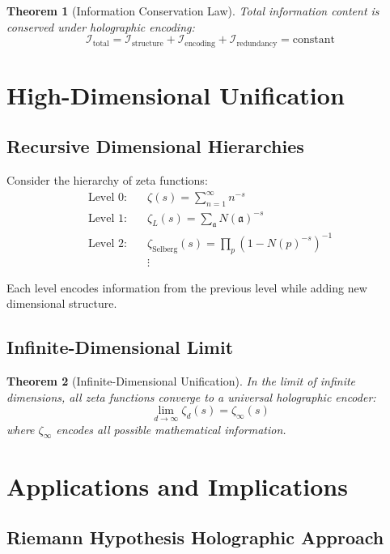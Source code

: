 \documentclass[12pt]{article}
\newtheorem{theorem}{Theorem}[section]
\begin{document}
\begin{theorem}[Information Conservation Law]
Total information content is conserved under holographic encoding:
$$\mathcal{I}_{\text{total}} = \mathcal{I}_{\text{structure}} + \mathcal{I}_{\text{encoding}} + \mathcal{I}_{\text{redundancy}} = \text{constant}$$
\end{theorem}

\section{High-Dimensional Unification}

\subsection{Recursive Dimensional Hierarchies}

Consider the hierarchy of zeta functions:
\begin{align}
\text{Level 0:} &\quad \zeta(s) = \sum_{n=1}^\infty n^{-s} \\
\text{Level 1:} &\quad \zeta_L(s) = \sum_{\mathfrak{a}} N(\mathfrak{a})^{-s} \\
\text{Level 2:} &\quad \zeta_{\text{Selberg}}(s) = \prod_p (1-N(p)^{-s})^{-1} \\
&\quad \vdots
\end{align}

Each level encodes information from the previous level while adding new dimensional structure.

\subsection{Infinite-Dimensional Limit}

\begin{theorem}[Infinite-Dimensional Unification]
In the limit of infinite dimensions, all zeta functions converge to a universal holographic encoder:
$$\lim_{d \to \infty} \zeta_d(s) = \zeta_\infty(s)$$
where $\zeta_\infty$ encodes all possible mathematical information.
\end{theorem}

\section{Applications and Implications}

\subsection{Riemann Hypothesis Holographic Approach}
\end{document}
